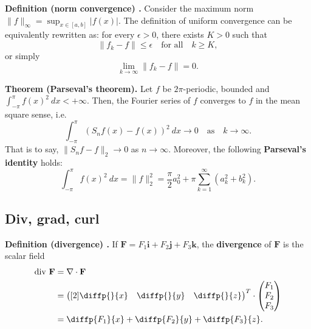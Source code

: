 \begin{shaded}
\textbf{Definition (norm convergence) \cite{math2111_notes}.} Consider the maximum norm $\lVert f \rVert_\infty = \sup_{x \in [a, b]} |f(x)|$. The definition of uniform convergence can be equivalently rewritten as: for every $\epsilon > 0$, there exists $K > 0$ such that
$$ \lVert f_k - f \rVert \leq \epsilon \quad \text{for all} \quad k \geq K , $$
or simply
$$ \lim_{k \to \infty} \lVert f_k - f \rVert = 0 . $$
\end{shaded}

\begin{shaded}
\textbf{Theorem (Parseval's theorem).} Let $f$ be $2 \pi$-periodic, bounded and $\int_{-\pi}^\pi f(x)^2 \ dx < + \infty$. Then, the Fourier series of $f$ converges to $f$ in the mean square sense, i.e.
$$ \int_{- \pi}^\pi (S_n f(x) - f(x))^2 \ dx \to 0 \quad \text{as} \quad k \to \infty . $$
That is to say, $\lVert S_n f - f \rVert_2 \to 0$ as $n \to \infty$. Moreover, the following \textbf{Parseval's identity} holds:
$$ \int_{-\pi}^\pi f(x)^2 \ dx = \lVert f \rVert_2^2 = \frac{\pi}{2} a_0^2 + \pi \sum_{k = 1}^{\infty} (a_k^2 + b_k^2) . $$
\end{shaded}

\subsection{Div, grad, curl}

\begin{shaded}
\textbf{Definition (divergence) \cite{math2111_notes}.} If $\mathbf{F} = F_1 \mathbf{i} + F_2 \mathbf{j} + F_3 \mathbf{k}$, the \textbf{divergence} of $\mathbf{F}$ is the scalar field
\begin{align*}
\text{div} \ \mathbf{F} &= \nabla \cdot \mathbf{F} \\
&= \begin{pmatrix}[2] \diffp{}{x} & \diffp{}{y} & \diffp{}{z} \end{pmatrix}^{T}
\cdot \begin{pmatrix} F_1 \\ F_2 \\ F_3 \end{pmatrix} \\
&= \diffp{F_1}{x} + \diffp{F_2}{y} + \diffp{F_3}{z} .
\end{align*}
\end{shaded}

